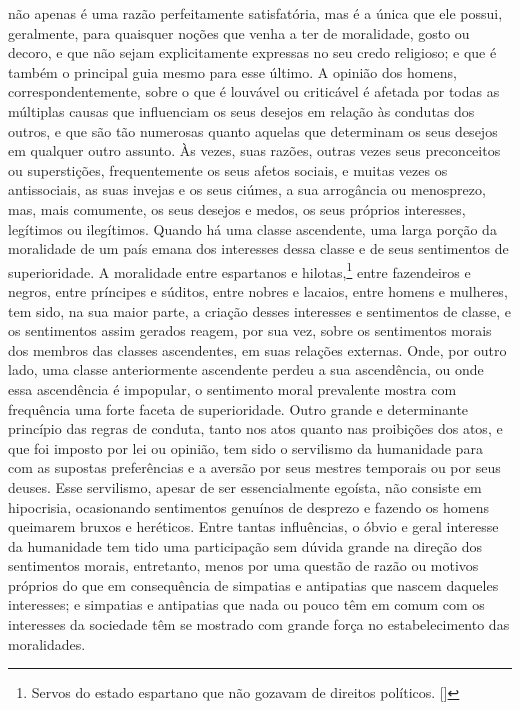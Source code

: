 não apenas é uma razão perfeitamente satisfatória, mas é a única que
ele possui, geralmente, para quaisquer noções que venha a ter de
moralidade, gosto ou decoro, e que não sejam explicitamente expressas no
seu credo religioso; e que é também o principal guia mesmo para esse
último. A opinião dos homens, correspondentemente, sobre o que é
louvável ou criticável é afetada por todas as múltiplas causas que
influenciam os seus desejos em relação às condutas dos outros, e que são
tão numerosas quanto aquelas que determinam os seus desejos em qualquer
outro assunto. Às vezes, suas razões, outras vezes seus
preconceitos ou superstições, frequentemente os seus afetos sociais, e
muitas vezes os antissociais, as suas invejas e os seus ciúmes, a sua
arrogância ou menosprezo, mas, mais comumente, os seus desejos e medos, os
seus próprios interesses, legítimos ou ilegítimos. Quando há uma classe
ascendente, uma larga porção da moralidade de um país emana dos
interesses dessa classe e de seus sentimentos de superioridade. A
moralidade entre espartanos e hilotas,\footnote{ Servos do estado espartano 
que não gozavam de direitos políticos. []} 
entre fazendeiros e negros, entre príncipes e súditos, 
entre nobres e lacaios, entre homens e mulheres, tem sido, na sua maior
parte, a criação desses interesses e sentimentos de classe, e os
sentimentos assim gerados reagem, por sua vez, sobre os sentimentos
morais dos membros das classes ascendentes, em suas relações externas.
Onde, por outro lado, uma classe anteriormente ascendente perdeu a sua
ascendência, ou onde essa ascendência é impopular, o sentimento moral
prevalente mostra com frequência uma forte faceta de superioridade.
Outro grande e determinante princípio das regras de conduta, tanto nos
atos quanto nas proibições dos atos, e que foi imposto por lei ou
opinião, tem sido o servilismo da humanidade para com as supostas
preferências e a aversão por seus mestres temporais ou por seus deuses.
Esse servilismo, apesar de ser essencialmente egoísta, não consiste em
hipocrisia, ocasionando sentimentos genuínos de desprezo e fazendo os
homens queimarem bruxos e heréticos. Entre tantas influências, o óbvio
e geral interesse da humanidade tem tido uma participação sem dúvida grande na direção dos sentimentos morais, entretanto, menos por uma questão de razão ou motivos próprios do que em
consequência de simpatias e antipatias que nascem daqueles interesses;
e simpatias e antipatias que nada ou pouco têm em comum com os
interesses da sociedade têm se mostrado com grande força no
estabelecimento das moralidades. 

